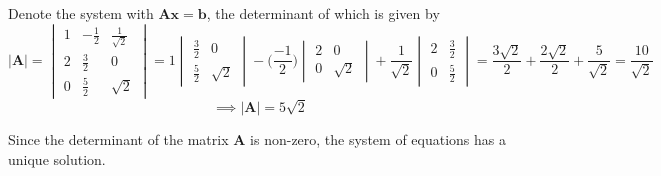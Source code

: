 Denote the system with \( \mathbf{A}\mathbf{x} = \mathbf{b} \), the determinant of which is given by
\[
    \left| \mathbf{A} \right| = \begin{vmatrix} 1 & -\frac{1}{2} & \frac{1}{\sqrt{2}} \\ 2 & \frac{3}{2} & 0 \\ 0 & \frac{5}{2} & \sqrt{2} \end{vmatrix}
    = 1 \begin{vmatrix} \frac{3}{2} & 0 \\ \frac{5}{2} & \sqrt{2} \end{vmatrix} - \Big(\frac{-1}{2}\Big) \begin{vmatrix} 2 & 0 \\ 0 & \sqrt{2} \end{vmatrix} + \frac{1}{\sqrt{2}} \begin{vmatrix} 2 & \frac{3}{2} \\ 0 & \frac{5}{2} \end{vmatrix}
    =\frac{3\sqrt{2}}{2} + \frac{2\sqrt{2}}{2} + \frac{5}{\sqrt{2}}
    = \frac{10}{\sqrt{2}}
\]
\[
    \implies \left| \mathbf{A} \right| = 5 \sqrt{2}
\]

Since the determinant of the matrix \( \mathbf{A} \) is non-zero, the system of equations has a unique solution.
